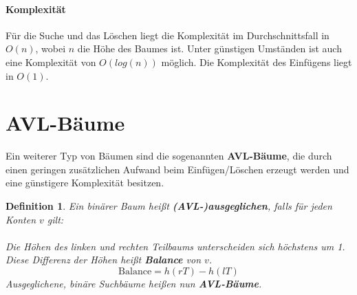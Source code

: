 \documentclass[11pt,a4paper]{scrartcl}
\newtheorem{definition}{Definition}
\begin{document}
\paragraph{Komplexität}
Für die Suche und das Löschen liegt die Komplexität im Durchschnittsfall in $O(n)$, wobei $n$ die Höhe des Baumes ist. Unter günstigen Umständen ist auch eine Komplexität von $O(log(n))$ möglich. Die Komplexität des Einfügens liegt in $O(1)$.
\section{AVL-Bäume}
Ein weiterer Typ von Bäumen sind die sogenannten \textbf{AVL-Bäume}, die durch einen geringen zusätzlichen Aufwand beim Einfügen/Löschen erzeugt werden und eine günstigere Komplexität besitzen.
\begin{definition}
Ein binärer Baum heißt \textbf{(AVL-)ausgeglichen}, falls für jeden Konten $v$ gilt: \\\\
Die Höhen des linken und rechten Teilbaums unterscheiden sich höchstens um 1. \\Diese Differenz der Höhen heißt \textbf{Balance} von $v$.
\[\text{Balance} = h(rT) - h(lT)\]
Ausgeglichene, binäre Suchbäume heißen nun \textbf{AVL-Bäume}.
\end{definition}
\end{document}
